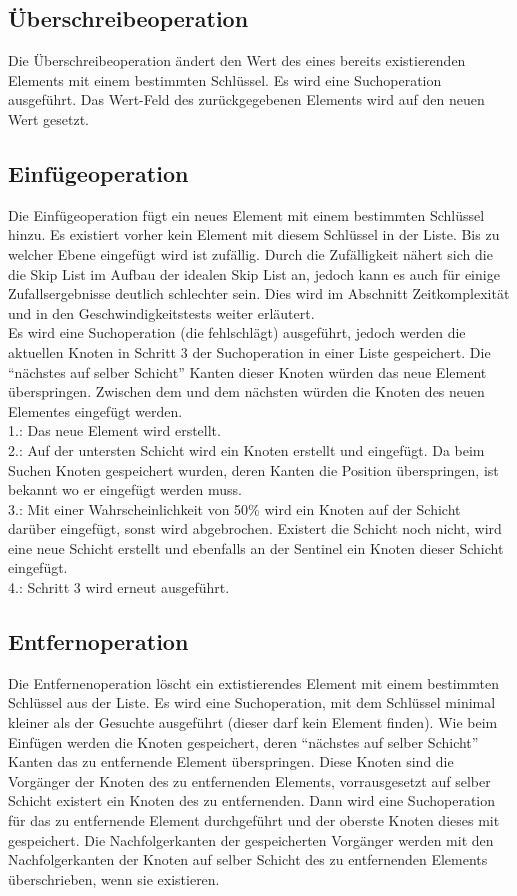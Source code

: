 \documentclass{TUBAFarbeiten}
\begin{document}
\subsection{Überschreibeoperation}

Die Überschreibeoperation ändert den Wert des eines bereits existierenden Elements mit einem bestimmten Schlüssel.
Es wird eine Suchoperation ausgeführt. Das Wert-Feld des zurückgegebenen Elements wird auf den neuen Wert gesetzt.

\subsection{Einfügeoperation}

Die Einfügeoperation fügt ein neues Element mit einem bestimmten Schlüssel hinzu. Es existiert vorher kein Element mit diesem Schlüssel in der Liste.
Bis zu welcher Ebene eingefügt wird ist zufällig. Durch die Zufälligkeit nähert sich die die Skip List im Aufbau der idealen Skip List an, jedoch kann es auch für einige Zufallsergebnisse deutlich schlechter sein. Dies wird im Abschnitt Zeitkomplexität und in den Geschwindigkeitstests weiter erläutert. \\
Es wird eine Suchoperation (die fehlschlägt) ausgeführt, jedoch werden die aktuellen Knoten in Schritt 3 der Suchoperation in einer Liste gespeichert.
Die "`nächstes auf selber Schicht"' Kanten dieser Knoten würden das neue Element überspringen. Zwischen dem und dem nächsten würden die Knoten des neuen Elementes eingefügt werden. \\ 1.: Das neue Element wird erstellt. \\ 2.: Auf der untersten Schicht wird ein Knoten erstellt und eingefügt. Da beim Suchen Knoten gespeichert wurden, deren Kanten die Position überspringen, ist bekannt wo er eingefügt werden muss. \\ 3.: Mit einer Wahrscheinlichkeit von 50\% wird ein Knoten auf der Schicht darüber eingefügt, sonst wird abgebrochen. Existert die Schicht noch nicht, wird eine neue Schicht erstellt und ebenfalls an der Sentinel ein Knoten dieser Schicht eingefügt. \\ 4.: Schritt 3 wird erneut ausgeführt.

\subsection{Entfernoperation}

Die Entfernenoperation löscht ein extistierendes Element mit einem bestimmten Schlüssel aus der Liste.
Es wird eine Suchoperation, mit dem Schlüssel minimal kleiner als der Gesuchte ausgeführt (dieser darf kein Element finden). Wie beim Einfügen werden die Knoten gespeichert, deren "`nächstes auf selber Schicht"' Kanten das zu entfernende Element überspringen. Diese Knoten sind die Vorgänger der Knoten des zu entfernenden Elements, vorrausgesetzt auf selber Schicht existert ein Knoten des zu entfernenden.
Dann wird eine Suchoperation für das zu entfernende Element durchgeführt und der oberste Knoten dieses mit gespeichert.
Die Nachfolgerkanten der gespeicherten Vorgänger werden mit den Nachfolgerkanten der Knoten auf selber Schicht des zu entfernenden Elements überschrieben, wenn sie existieren.
\end{document}
